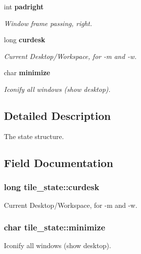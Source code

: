\begin{CompactItemize}
int {\bf padright}
\begin{CompactList}\small\item\em Window frame passing, right. \item\end{CompactList}\item 
long {\bf curdesk}
\begin{CompactList}\small\item\em Current Desktop/Workspace, for -m and -w. \item\end{CompactList}\item 
char {\bf minimize}
\begin{CompactList}\small\item\em Iconify all windows (show desktop). \item\end{CompactList}\end{CompactItemize}


\subsection{Detailed Description}
The state structure. 



\subsection{Field Documentation}
\subsubsection{\setlength{\rightskip}{0pt plus 5cm}long {\bf tile\_\-state::curdesk}}\label{structtile__state_o8}


Current Desktop/Workspace, for -m and -w. 

\subsubsection{\setlength{\rightskip}{0pt plus 5cm}char {\bf tile\_\-state::minimize}}\label{structtile__state_o9}


Iconify all windows (show desktop). 

